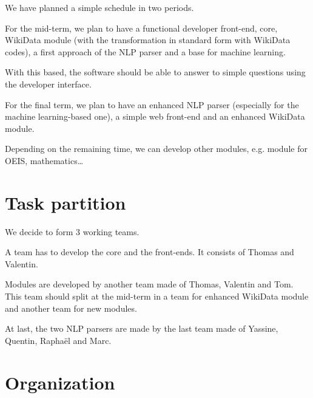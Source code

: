 \documentclass[a4paper,10pt]{article}
\begin{document}
We have planned a simple schedule in two periods.

For the mid-term, we plan to have a functional developer front-end, core, WikiData module (with the transformation in standard form with WikiData codes), a first approach of the NLP parser and a base for machine learning.

With this based, the software should be able to answer to simple questions using the developer interface.

For the final term, we plan to have an enhanced NLP parser (especially for the machine learning-based one), a simple web front-end and an enhanced WikiData module.

Depending on the remaining time, we can develop other modules, e.g. module for OEIS, mathematics\ldots

\section{Task partition}

We decide to form 3 working teams.

A team has to develop the core and the front-ends. It consists of Thomas and Valentin.

Modules are developed by another team made of Thomas, Valentin and Tom. This team should split at the mid-term in a team for enhanced WikiData module and another team for new modules.

At last, the two NLP parsers are made by the last team made of Yassine, Quentin, Raphaël and Marc.


\section{Organization}

\end{document}
